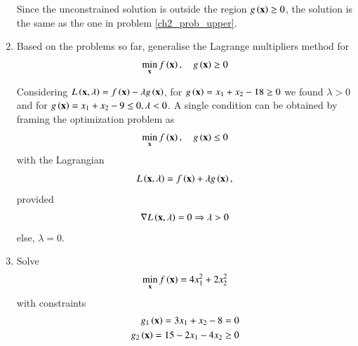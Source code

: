 \documentclass[journal,12pt,twocolumn]{IEEEtran}
\renewcommand\thesection{\arabic{section}}
\begin{document}
\begin{enumerate}[label=\thesection.\arabic*,ref=\thesection.\theenumi]
%
\solution Since the unconstrained solution is outside the region $g\left(\mathbf{x}\right) \geq 0$, the solution is the same as the one in problem \ref{ch2_prob_upper}.
%
\item
Based on the problems so far, generalise the Lagrange multipliers method for 
%
	 \begin{align}
	 \label{ch2_lagrange_ineq}
	\min_{\mathbf{x}} f\left(\mathbf{x}\right) , \quad 
	 g\left(\mathbf{x}\right)  \geq 0 
	 \end{align}
%

%
\solution
Considering $L\left(\mathbf{x},\lambda\right) = f\left(\mathbf{x}\right) - \lambda g\left(\mathbf{x}\right)$, for $g\left(\mathbf{x}\right) = x_1 + x_2 - 18 \geq 0$ we found $\lambda > 0 $ and for $g\left(\mathbf{x}\right) = x_1 + x_2 - 9 \leq 0, \lambda < 0$. A single condition can be obtained by framing the optimization problem as
%
	 \begin{align}
	 \label{ch2_lagrange_ineq_summary}
	\min_{\mathbf{x}} f\left(\mathbf{x}\right) , \quad 
	 g\left(\mathbf{x}\right)  \leq 0 
	 \end{align}
%
with the Lagrangian
%
\begin{equation}
L\brak{\mbf{x},\lambda} = f\brak{\mbf{x}} + \lambda g\brak{\mbf{x}}, %
\end{equation}
%
provided
%
\begin{equation}
\label{ch2_kkt_necessary}
\nabla L\left(\mathbf{x},\lambda\right) = 0 \Rightarrow \lambda > 0
\end{equation}
else, $\lambda = 0$.
\item
Solve
 \begin{align}
 \label{ch2_kkt_problem}
\min_{\mathbf{x}} f\left(\mathbf{x}\right) = 4x_1^2 + 2x_2^2
 \end{align}
 with constraints
 \begin{align}
 g_1\left(\mathbf{x}\right) = 3x_1 + x_2-8 = 0\\
 g_2 \left(\mathbf{x}\right)= 15 - 2x_1 - 4x_2 \geq 0
 \end{align}
 

\end{enumerate}
\end{document}
